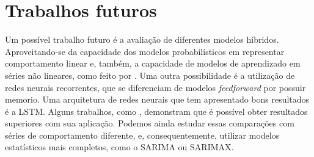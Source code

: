 \documentclass[
    12pt,
    oneside,
    a4paper,
    english,
    brazil
]{abntex2}
\begin{document}
\section{Trabalhos futuros}

Um  possível trabalho  futuro é  a  avaliação de  diferentes modelos  híbridos.
Aproveitando-se  da  capacidade  dos  modelos  probabilísticos  em  representar
comportamento  linear  e,  também,  a  capacidade  de  modelos  de  aprendizado
em  séries não  lineares, como  feito por  .
Uma  outra possibilidade  é  a  utilização de  redes  neurais recorrentes,  que
se  diferenciam  de  modelos  \textit{feedforward}  por  possuir  memorio.  Uma
arquitetura de  redes neurais  que tem  apresentado bons  resultados é  a LSTM.
Alguns  trabalhos, como  , demonstram
que  é  possível  obter  resultados   superiores  com  sua  aplicação.  Podemos
ainda  estudar essas  comparações  com séries  de  comportamento diferente,  e,
consequentemente, utilizar  modelos estatísticos mais completos,  como o SARIMA
ou SARIMAX\@.

\postextual


\end{document}
